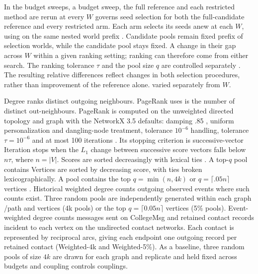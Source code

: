 \documentclass[smallextended]{svjour3}
\providecommand{\DIFaddtex}[1]{{\protect\color{blue} \sf #1}} %
\providecommand{\DIFdeltex}[1]{{\protect\color{red} \scriptsize #1}} %
\providecommand{\DIFaddbegin}{} %
\providecommand{\DIFaddend}{} %
\providecommand{\DIFdelbegin}{} %
\providecommand{\DIFdelend}{} %
\providecommand{\DIFadd}[1]{\texorpdfstring{\DIFaddtex{#1}}{#1}} %
\providecommand{\DIFdel}[1]{\texorpdfstring{\DIFdeltex{#1}}{}} %
\providecommand{\DIFscaledelfig}{0.5}
\newlength{\DIFdelgraphicswidth} %
\newlength{\DIFdelgraphicsheight} %
\providecommand{\DIFaddincludegraphics}[2][]{{\color{blue}\fbox{\DIFOincludegraphics[#1]{#2}}}} %
\providecommand{\DIFdelincludegraphics}[2][]{%
\sbox{\DIFdelgraphicsbox}{\DIFOincludegraphics[#1]{#2}}%
\settoboxwidth{\DIFdelgraphicswidth}{\DIFdelgraphicsbox} %
\settoboxtotalheight{\DIFdelgraphicsheight}{\DIFdelgraphicsbox} %
\scalebox{\DIFscaledelfig}{%
\parbox[b]{\DIFdelgraphicswidth}{\usebox{\DIFdelgraphicsbox}\\[-\baselineskip] \rule{\DIFdelgraphicswidth}{0em}}\llap{\resizebox{\DIFdelgraphicswidth}{\DIFdelgraphicsheight}{%
\setlength{\unitlength}{\DIFdelgraphicswidth}%
\begin{picture}(1,1)%
\thicklines\linethickness{2pt} %
{\color[rgb]{1,0,0}\put(0,0){\framebox(1,1){}}}%
{\color[rgb]{1,0,0}\put(0,0){\line( 1,1){1}}}%
{\color[rgb]{1,0,0}\put(0,1){\line(1,-1){1}}}%
\end{picture}%
}\hspace*{3pt}}} %
} %
\DeclareRobustCommand{\DIFaddbegin}{\DIFOaddbegin \let\includegraphics\DIFaddincludegraphics} %
\DeclareRobustCommand{\DIFaddend}{\DIFOaddend \let\includegraphics\DIFOincludegraphics} %
\DeclareRobustCommand{\DIFdelbegin}{\DIFOdelbegin \let\includegraphics\DIFdelincludegraphics} %
\DeclareRobustCommand{\DIFdelend}{\DIFOaddend \let\includegraphics\DIFOincludegraphics} %
\begin{document}
In \DIFdelbegin \DIFdel{the budget sweeps, }\DIFdelend \DIFaddbegin \DIFadd{a budget sweep, the full reference and each restricted method are rerun at every }\DIFaddend $W$ \DIFdelbegin \DIFdel{governs seed selection for both the full-candidate reference and every restricted arm. Each arm selects its seeds anew at each $W$, using }\DIFdelend \DIFaddbegin \DIFadd{on }\DIFaddend the same nested \DIFdelbegin \DIFdel{world prefix . Candidate pools remain fixed}\DIFdelend \DIFaddbegin \DIFadd{prefix of selection worlds, while the candidate pool stays fixed. A change in their gap }\DIFaddend across $W$ \DIFdelbegin \DIFdel{within a given ranking setting; ranking }\DIFdelend \DIFaddbegin \DIFadd{can therefore come from either search. The ranking }\DIFaddend tolerance $\tau$ and \DIFaddbegin \DIFadd{the }\DIFaddend pool size $q$ are \DIFdelbegin \DIFdel{controlled separately . The resulting relative differences reflect changes in both selection procedures, rather than improvement of the reference alone.
}\DIFdelend \DIFaddbegin \DIFadd{varied separately from $W$.
}\DIFaddend 

Degree \DIFdelbegin \DIFdel{ranks distinct outgoing neighbours. PageRank uses }\DIFdelend \DIFaddbegin \DIFadd{is the number of distinct out-neighbours. PageRank is computed on }\DIFaddend the unweighted directed \DIFdelbegin \DIFdel{topology and }\DIFdelend \DIFaddbegin \DIFadd{graph with the }\DIFaddend NetworkX 3.5 defaults: damping \DIFdelbegin \DIFdel{.85}\DIFdelend \DIFaddbegin \DIFadd{0.85}\DIFaddend , uniform personalization and dangling-node \DIFdelbegin \DIFdel{treatment, tolerance $10^{-6}$ }\DIFdelend \DIFaddbegin \DIFadd{handling, tolerance $\tau=10^{-6}$ }\DIFaddend and at most 100 iterations \cite{networkxpr}. \DIFdelbegin \DIFdel{Its stopping criterion is successive-vector }\DIFdelend \DIFaddbegin \DIFadd{Iteration stops when the }\DIFaddend $L_1$ change \DIFaddbegin \DIFadd{between successive score vectors falls }\DIFaddend below $n\tau$, where $n=|V|$. \DIFdelbegin \DIFdel{Scores are sorted decreasingly with lexical ties . A top-$q$ pool contains }\DIFdelend \DIFaddbegin \DIFadd{Vertices are sorted by decreasing score, with ties broken lexicographically. A pool contains the top }\DIFaddend $q=\min(n,4k)$ \DIFdelbegin \DIFdel{or $q=\lceil .05n\rceil$ vertices . Historical weighted degree counts outgoing observed events where such counts exist. Three random pools are independently generated within each graph /path and }\DIFdelend \DIFaddbegin \DIFadd{vertices (4k pools) or the top $q=\lceil 0.05n\rceil$ vertices (5\% pools). Event-weighted degree counts messages sent on CollegeMsg and retained contact records incident to each vertex on the undirected contact networks. Each contact is represented by reciprocal arcs, giving each endpoint one outgoing record per retained contact (Weighted-4k and Weighted-5\%). As a baseline, three random pools of size $4k$ are drawn for each graph and replicate and held }\DIFaddend fixed across budgets and \DIFdelbegin \DIFdel{coupling controls}\DIFdelend \DIFaddbegin \DIFadd{couplings}\DIFaddend .
\end{document}
